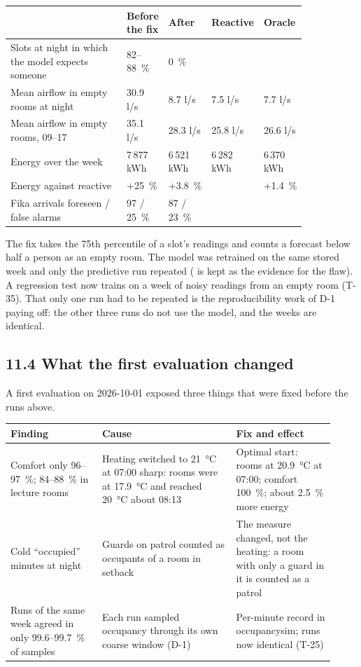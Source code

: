 \begin{longtable}[]{@{}L{0.40\linewidth}L{0.13\linewidth}L{0.11\linewidth}L{0.10\linewidth}L{0.10\linewidth}@{}}
\toprule
 & \textbf{Before the fix} & \textbf{After} & \textbf{Reactive} & \textbf{Oracle} \\
\midrule
\endhead
Slots at night in which the model expects someone & 82--88~\% & 0~\% & & \\
Mean airflow in empty rooms at night & 30.9 l/s & 8.7 l/s & 7.5 l/s & 7.7 l/s \\
Mean airflow in empty rooms, 09--17 & 35.1 l/s & 28.3 l/s & 25.8 l/s & 26.6 l/s \\
Energy over the week & 7\,877 kWh & 6\,521 kWh & 6\,282 kWh & 6\,370 kWh \\
Energy against reactive & +25~\% & +3.8~\% & & +1.4~\% \\
Fika arrivals foreseen / false alarms & 97 / 25~\% & 87 / 23~\% & & \\
\bottomrule
\end{longtable}

The fix takes the 75th percentile of a slot's readings and counts a forecast
below half a person as an empty room. The model was retrained on the same
stored week and only the predictive run repeated
( is kept as the evidence for the flaw). A regression
test now trains on a week of noisy readings from an empty room (T-35). That
only one run had to be repeated is the reproducibility work of D-1 paying off:
the other three runs do not use the model, and the weeks are identical.

\subsection{11.4 What the first evaluation changed}

A first evaluation on 2026-10-01 exposed three things that were fixed before
the runs above.

\begin{longtable}[]{@{}L{0.26\linewidth}L{0.38\linewidth}L{0.28\linewidth}@{}}
\toprule
\textbf{Finding} & \textbf{Cause} & \textbf{Fix and effect} \\
\midrule
\endhead
Comfort only 96--97~\%; 84--88~\% in lecture rooms & Heating switched to 21~°C at 07:00 sharp: rooms were at 17.9~°C and reached 20~°C about 08:13 & Optimal start: rooms at 20.9~°C at 07:00; comfort 100~\%; about 2.5~\% more energy \\
Cold ``occupied'' minutes at night & Guards on patrol counted as occupants of a room in setback & The measure changed, not the heating: a room with only a guard in it is counted as a patrol \\
Runs of the same week agreed in only 99.6--99.7~\% of samples & Each run sampled occupancy through its own coarse window (D-1) & Per-minute record in occupancysim; runs now identical (T-25) \\
\bottomrule
\end{longtable}

